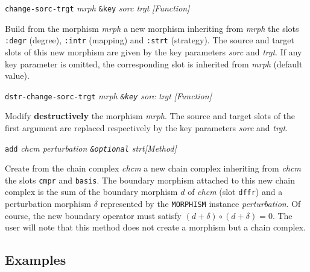 \newpage
{\parindent=0mm
{\leftskip=5mm
{\tt change-sorc-trgt} {\em mrph} {\tt \&key} {\em sorc trgt} \hfill {\em [Function]} \par}
{\leftskip=15mm
Build from the morphism {\em mrph} a new morphism inheriting from
{\em mrph} the slots {\tt :degr} (degree), {\tt :intr} (mapping) and
{\tt :strt} (strategy). The source  and target slots of this new morphism are given
by the key parameters {\em sorc} and {\em trgt}. If any
key parameter is omitted, the corresponding slot is
inherited from {\em mrph} (default value). \par}
{\leftskip=5mm
{\tt dstr-change-sorc-trgt} {\em mrph {\tt \&key}  sorc trgt} \hfill {\em [Function]} \par}
{\leftskip=15mm
Modify {\bf destructively} the morphism {\em mrph}. The source  and target slots of the first argument
are replaced respectively by the key parameters {\em sorc} and {\em trgt}. \par}
{\leftskip=5mm
{\tt add} {\em chcm perturbation {\tt \&optional} strt}\hfill {\em [Method]} \par}
{\leftskip=15mm
Create from the chain complex {\em chcm} a new chain complex inheriting
from {\em chcm} the slots {\tt cmpr} and {\tt basis}. The boundary morphism
attached to this new chain complex  is the sum of the boundary morphism $d$
of {\em chcm} (slot {\tt dffr}) and a perturbation morphism $\delta$ represented by
the {\tt MORPHISM} instance {\em perturbation}. Of course, the new boundary operator
must satisfy $(d+\delta)\circ (d+\delta)=0$. The user will note that this method
does not create a morphism but a chain complex.\par}
}

\newpage

\subsection*{Examples}

